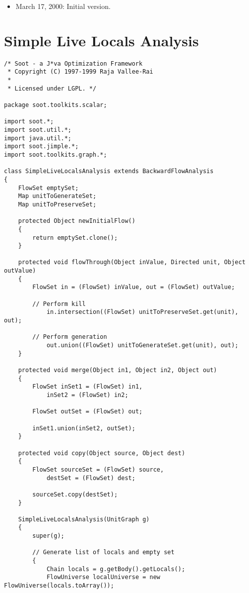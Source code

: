 \documentclass{article}
\begin{document}
\begin{itemize}
\item March 17, 2000: Initial version.
\end{itemize}

\appendix

\section*{Simple Live Locals Analysis}
\label{simpleAnalysis}

\begin{verbatim}
/* Soot - a J*va Optimization Framework
 * Copyright (C) 1997-1999 Raja Vallee-Rai
 *
 * Licensed under LGPL. */

package soot.toolkits.scalar;

import soot.*;
import soot.util.*;
import java.util.*;
import soot.jimple.*;
import soot.toolkits.graph.*;

class SimpleLiveLocalsAnalysis extends BackwardFlowAnalysis
{
    FlowSet emptySet;
    Map unitToGenerateSet;
    Map unitToPreserveSet;

    protected Object newInitialFlow()
    {
        return emptySet.clone();
    }
	
    protected void flowThrough(Object inValue, Directed unit, Object outValue)
    {
        FlowSet in = (FlowSet) inValue, out = (FlowSet) outValue;

        // Perform kill
            in.intersection((FlowSet) unitToPreserveSet.get(unit), out);

        // Perform generation
            out.union((FlowSet) unitToGenerateSet.get(unit), out);
    }

    protected void merge(Object in1, Object in2, Object out)
    {
        FlowSet inSet1 = (FlowSet) in1,
            inSet2 = (FlowSet) in2;

        FlowSet outSet = (FlowSet) out;

        inSet1.union(inSet2, outSet);
    }
    
    protected void copy(Object source, Object dest)
    {
        FlowSet sourceSet = (FlowSet) source,
            destSet = (FlowSet) dest;
            
        sourceSet.copy(destSet);
    }

    SimpleLiveLocalsAnalysis(UnitGraph g)
    {
        super(g);

        // Generate list of locals and empty set
        {
            Chain locals = g.getBody().getLocals();
            FlowUniverse localUniverse = new FlowUniverse(locals.toArray());


\end{verbatim}
\end{document}
